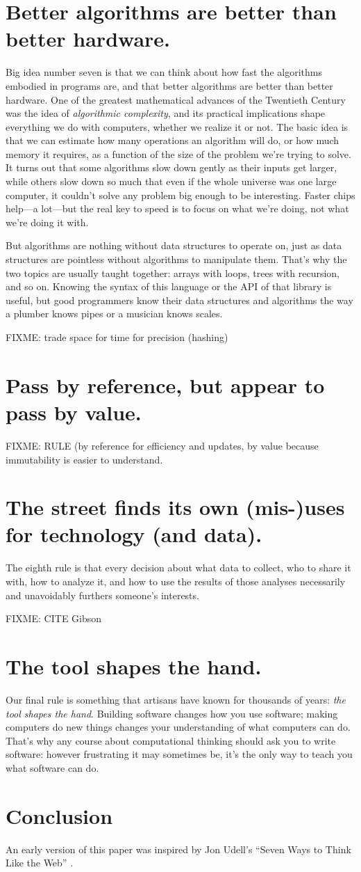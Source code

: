 \documentclass[10pt,letterpaper]{article}
\newcommand{\rulemajor}[1]{\section{#1}}
\begin{document}
\rulemajor{Better algorithms are better than better hardware.}

Big idea number seven is that we can think about how fast the algorithms embodied
in programs are, and that better algorithms are better than better hardware.
One of the greatest mathematical advances of the Twentieth Century was the idea
of \emph{algorithmic complexity}, and its practical implications shape
everything we do with computers, whether we realize it or not.  The basic idea
is that we can estimate how many operations an algorithm will do, or how much
memory it requires, as a function of the size of the problem we're trying to
solve.  It turns out that some algorithms slow down gently as their inputs get
larger, while others slow down so much that even if the whole universe was one
large computer, it couldn't solve any problem big enough to be interesting.
Faster chips help—a lot—but the real key to speed is to focus on what we're
doing, not what we're doing it with.

But algorithms are nothing without data structures to operate on, just as data
structures are pointless without algorithms to manipulate them.  That's why the
two topics are usually taught together: arrays with loops, trees with recursion,
and so on.  Knowing the syntax of this language or the API of that library is
useful, but good programmers know their data structures and algorithms the way a
plumber knows pipes or a musician knows scales.

FIXME: trade space for time for precision (hashing)

\rulemajor{Pass by reference, but appear to pass by value.}

FIXME: RULE (by reference for efficiency and updates, by value because
immutability is easier to understand.

\rulemajor{The street finds its own (mis-)uses for technology (and data).}

The eighth rule is that every decision about what data to collect, who to share
it with, how to analyze it, and how to use the results of those analyses
necessarily and unavoidably furthers someone's interests.

FIXME: CITE Gibson

\rulemajor{The tool shapes the hand.}

Our final rule is something that artisans have known for thousands of years:
\emph{the tool shapes the hand}.  Building software changes how you use
software; making computers do new things changes your understanding of what
computers can do.  That's why any course about computational thinking should ask
you to write software: however frustrating it may sometimes be, it's the only
way to teach you what software can do.

\section*{Conclusion}

An early version of this paper was inspired by Jon Udell's ``Seven Ways to Think
Like the Web'' \cite{Udel2011}.


\end{document}
